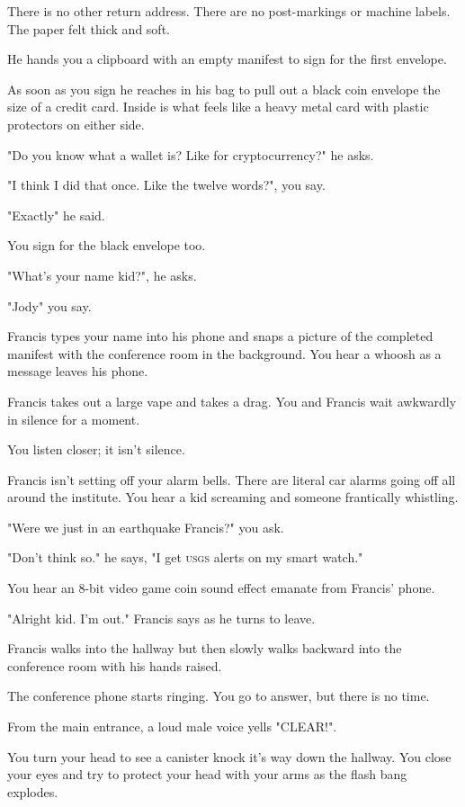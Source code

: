 \documentclass[a5paper, symmetric]{tufte-book}
\begin{document}
There is no other return address. There are no post-markings or machine labels. The paper felt thick and soft. 

He hands you a clipboard with an empty manifest to sign for the first envelope. 

As soon as you sign he reaches in his bag to pull out a black coin envelope the size of a credit card. Inside is what feels like a heavy metal card with plastic protectors on either side.

"Do you know what a wallet is? Like for cryptocurrency?" he asks. 

"I think I did that once. Like the twelve words?", you say. 

"Exactly" he said. 

You sign for the black envelope too. 

"What's your name kid?", he asks.

"Jody" you say. 

Francis types your name into his phone and snaps a picture of the completed manifest with the conference room in the background. You hear a whoosh as a message leaves his phone. 

Francis takes out a large vape and takes a drag. You and Francis wait awkwardly in silence for a moment. 

You listen closer; it isn't silence. 

Francis isn't setting off your alarm bells. There are literal car alarms going off all around the institute. You hear a kid screaming and someone frantically whistling. 

"Were we just in an earthquake Francis?" you ask.

"Don't think so." he says, "I get \textsc{usgs} alerts on my smart watch."

You hear an 8-bit video game coin sound effect emanate from Francis' phone. 

"Alright kid. I'm out." Francis says as he turns to leave.

Francis walks into the hallway but then slowly walks backward into the conference room with his hands raised. 

The conference phone starts ringing. You go to answer, but there is no time.

From the main entrance, a loud male voice yells "CLEAR!".

You turn your head to see a canister knock it's way down the hallway. You close your eyes and try to protect your head with your arms as the flash bang explodes. 
\end{document}
